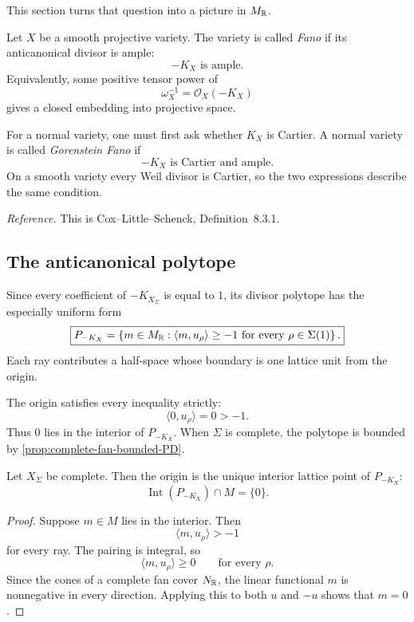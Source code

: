 This section turns that question into a picture in \(M_{\mathbb{R}}\).

\begin{agcheatsheet}
Let \(X\) be a smooth projective variety. The variety is called
\emph{Fano} if its anticanonical divisor is ample:
\[
-K_X\text{ is ample}.
\]
Equivalently, some positive tensor power of
\[
\omega_X^{-1}=\mathcal O_X(-K_X)
\]
gives a closed embedding into projective space.

For a normal variety, one must first ask whether \(K_X\) is Cartier.
A normal variety is called \emph{Gorenstein Fano} if
\[
-K_X\text{ is Cartier and ample}.
\]
On a smooth variety every Weil divisor is Cartier, so the two
expressions describe the same condition.
\end{agcheatsheet}

\noindent
\textit{Reference.}
This is Cox--Little--Schenck, Definition~8.3.1.

\subsection{The anticanonical polytope}

Since every coefficient of \(-K_{X_\Sigma}\) is equal to \(1\), its
divisor polytope has the especially uniform form
\[
\boxed{
P_{-K_X}
=
\left\{
 m\in M_{\mathbb{R}}:
 \langle m,u_\rho\rangle\geq-1
 \text{ for every }\rho\in\Sigma(1)
\right\}.
}
\]
Each ray contributes a half-space whose boundary is one lattice unit
from the origin.

The origin satisfies every inequality strictly:
\[
\langle 0,u_\rho\rangle=0>-1.
\]
Thus \(0\) lies in the interior of \(P_{-K_X}\). When \(\Sigma\) is
complete, the polytope is bounded by
\cref{prop:complete-fan-bounded-PD}.

\begin{proposition}
\label{prop:anticanonical-unique-interior-point}
Let \(X_\Sigma\) be complete. Then the origin is the unique interior
lattice point of \(P_{-K_X}\):
\[
\operatorname{Int}(P_{-K_X})\cap M=\{0\}.
\]
\end{proposition}

\begin{proof}
Suppose \(m\in M\) lies in the interior. Then
\[
\langle m,u_\rho\rangle>-1
\]
for every ray. The pairing is integral, so
\[
\langle m,u_\rho\rangle\geq0
\qquad
\text{for every }\rho.
\]
Since the cones of a complete fan cover \(N_{\mathbb{R}}\), the linear
functional \(m\) is nonnegative in every direction. Applying this to
both \(u\) and \(-u\) shows that \(m=0\).
\end{proof}

